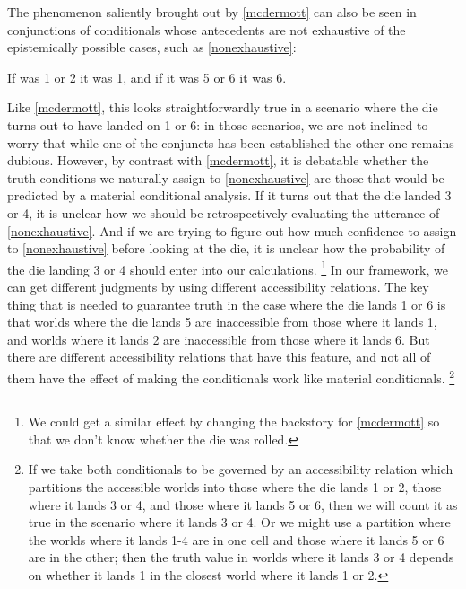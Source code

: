 \documentclass[If.tex]{subfiles}
\begin{document}
\begin{prop}
The phenomenon saliently brought out by \ref{mcdermott} can also be seen in conjunctions of conditionals whose antecedents are not exhaustive of the epistemically possible cases, such as \ref{nonexhaustive}:
\begin{prop}
	\nitem \label{nonexhaustive}
	If was 1 or 2 it was 1, and if it was 5 or 6 it was 6.
\end{prop}
Like \ref{mcdermott}, this looks straightforwardly true in a scenario where the die turns out to have landed on 1 or 6: in those scenarios, we are not inclined to worry that while one of the conjuncts has been established the other one remains dubious.  However, by contrast with \ref{mcdermott}, it is debatable whether the truth conditions we naturally assign to \ref{nonexhaustive} are those that would be predicted by a material conditional analysis.  If it turns out that the die landed 3 or 4, it is unclear how we should be retrospectively evaluating the utterance of \ref{nonexhaustive}.  And if we are trying to figure out how much confidence to assign to \ref{nonexhaustive} before looking at the die, it is unclear how the probability of the die landing 3 or 4 should enter into our calculations.%
\footnote{We could get a similar effect by changing the backstory for \ref{mcdermott} so that we don't know whether the die was rolled.}
In our framework, we can get different judgments by using different accessibility relations.  The key thing that is needed to guarantee truth in the case where the die lands 1 or 6 is that worlds where the die lands 5 are inaccessible from those where it lands 1, and worlds where it lands 2 are inaccessible from those where it lands 6.  But there are different accessibility relations that have this feature, and not all of them have the effect of making the conditionals work like material conditionals.%
\footnote{If we take both conditionals to be governed by an accessibility relation which partitions the accessible worlds into those where the die lands 1 or 2, those where it lands 3 or 4, and those where it lands 5 or 6, then we will count it as true in the scenario where it lands 3 or 4.  Or we might use a partition where the worlds where it lands 1-4 are in one cell and those where it lands 5 or 6 are in the other; then the truth value in worlds where it lands 3 or 4 depends on whether it lands 1 in the closest world where it lands 1 or 2.  
}
\end{prop}
\end{document}
